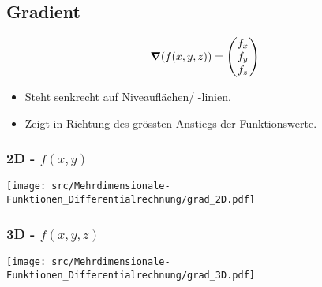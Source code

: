 \subsection{Gradient}
    $$
        \grad(f(x,y,z)) = \begin{pmatrix}
            f_x \\ f_y \\ f_z
        \end{pmatrix}
    $$
    \begin{itemize}
        \item Steht senkrecht auf Niveauflächen/ -linien.
        \item Zeigt in Richtung des grössten Anstiegs der Funktionswerte.
    \end{itemize}
    \subsubsection{2D - $f(x,y)$}
        \texttt{[image: src/Mehrdimensionale-Funktionen\_Differentialrechnung/grad\_2D.pdf]}
    \subsubsection{3D - $f(x,y,z)$}
        \begin{center}
            \texttt{[image: src/Mehrdimensionale-Funktionen\_Differentialrechnung/grad\_3D.pdf]}
        \end{center}